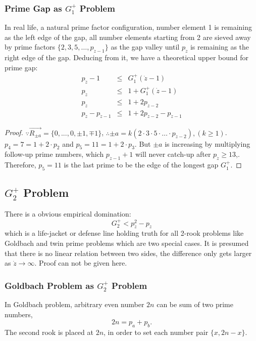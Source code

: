 \documentclass[twocolumn]{article}%
\theoremstyle{definition}
\theoremstyle{remark}
\begin{document}
\subsubsection*{Prime Gap as $G_1^{+}$ Problem}
In real life, a natural prime factor configuration, number element 1 is remaining as the left edge of the gap, all number elements starting from 2 are sieved away by prime factors $\{2,3,5,\dots,p_{\dot{z}-1}\}$ as the gap valley until $p_{\dot{z}}$ is remaining as the right edge of the gap.
Deducing from it, we have a theoretical upper bound for prime gap:
\begin{eqnarray*}
	p_{\dot{z}}-1 &\le& G_1^{+}(\dot{z}-1)\\
	p_{\dot{z}} &\le& 1+G_1^{+}(\dot{z}-1)\\
	p_{\dot{z}} &\le& 1+2p_{\dot{z}-2}\\
	p_{\dot{z}} - p_{\dot{z}-1} &\le& 1+2p_{\dot{z}-2} - p_{\dot{z}-1}
\end{eqnarray*}
\begin{proof}
$\because \overrightarrow{R_{\pm a}}=\{0,...,0,\pm1,\mp 1\}$, $\therefore  \pm a = k(2\cdot3\cdot5\cdot\dots\cdot p_{\dot{z}-2}), (k\ge1)$. $p_4=7=1+2\cdot p_2$ and $p_5=11=1+2\cdot p_3$.
But	$\pm a$ is increasing by multiplying follow-up prime numbers, which $p_{\dot{z}-1}+1$ will never catch-up after $p_{\dot{z}}\ge13$,. Therefore, $p_5=11$ is the last prime to be the edge of the longest gap $G_1^{+}$.	
\end{proof}


\subsection*{$G_2^{+}$ Problem}
There is a obvious empirical domination:
\begin{equation}\label{thedomination}
G_2^{+} < p_{\dot{z}}^2-p_{\dot{z}}
\end{equation}
which is a life-jacket or defense line holding truth for all 2-rook problems like Goldbach and twin prime problems which are two special cases. It is presumed that there is no linear relation  between two sides, the difference only gets larger as $\dot{z} \rightarrow \infty$. Proof can not be given here.

\subsubsection*{Goldbach Problem as $G_2^{+}$ Problem}
In Goldbach problem, arbitrary even number $2n$ can be sum of two prime numbers, 
\begin{equation*}
2n = p_a + p_b.
\end{equation*}
The second rook is placed at $2n$, in order to set each number pair $\{x,2n-x\}$. 
\end{document}
